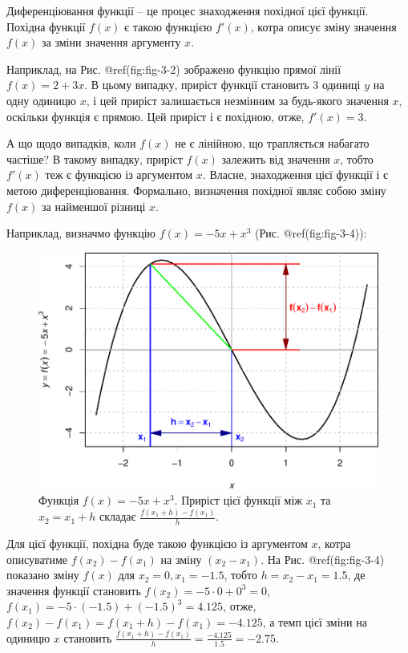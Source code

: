 \documentclass[
  11pt,
]{book}
\begin{document}
Диференціювання функції -- це процес знаходження похідної цієї функції.
Похідна функції \(f(x)\) є такою функцією \(f'(x)\), котра описує зміну
значення \(f(x)\) за зміни значення аргументу \(x\).

Наприклад, на Рис. @ref(fig:fig-3-2) зображено функцію прямої лінії
\(f(x) = 2 + 3x\). В цьому випадку, приріст функції становить 3 одиниці
\(y\) на одну одиницю \(x\), і цей приріст залишається незмінним за
будь-якого значення \(x\), оскільки функція є прямою. Цей приріст і є
похідною, отже, \(f'(x) = 3\).

А що щодо випадків, коли \(f(x)\) не є лінійною, що трапляється набагато
частіше? В такому випадку, приріст \(f(x)\) залежить від значення \(x\),
тобто \(f'(x)\) теж є функцією із аргументом \(x\). Власне, знаходження
цієї функції і є метою диференціювання. Формально, визначення похідної
являє собою зміну \(f(x)\) за найменшої різниці \(x\).

Наприклад, визначмо функцію \(f(x) = -5x + x^3\) (Рис.
@ref(fig:fig-3-4)):

\begin{figure}
\centering
\includegraphics{bookdown-demo_files/figure-latex/fig-3-4-1.pdf}
\caption{Функція \(f(x) = -5x + x^3\). Приріст цієї функції між \(x_1\)
та \(x_2 = x_1 + h\) складає \(\frac{f(x_1 + h) - f(x_1)}{h}\).}
\end{figure}

Для цієї функції, похідна буде такою функцією із аргументом \(x\), котра
описуватиме \(f(x_2) - f(x_1)\) на зміну \((x_2 - x_1)\). На Рис.
@ref(fig:fig-3-4) показано зміну \(f(x)\) для \(x_2 = 0, x_1 = -1.5\),
тобто \(h = x_2 - x_1 = 1.5\), де значення функції становить
\(f(x_2) = -5 \cdot 0 + 0^3 = 0\),
\(f(x_1) = -5 \cdot (-1.5) + (-1.5)^3 = 4.125\), отже,
\(f(x_2) - f(x_1) = f(x_1+h) - f(x_1) = -4.125\), а темп цієї зміни на
одиницю \(x\) становить
\(\frac{f(x_1 + h) - f(x_1)}{h} = \frac{-4.125}{1.5} = -2.75\).
\end{document}
